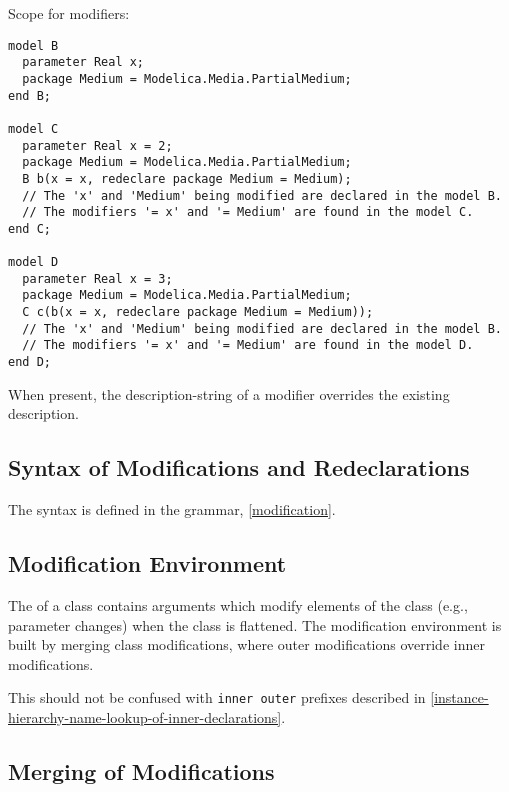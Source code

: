 \begin{example}
Scope for modifiers:
\begin{lstlisting}[language=modelica]
model B
  parameter Real x;
  package Medium = Modelica.Media.PartialMedium;
end B;

model C
  parameter Real x = 2;
  package Medium = Modelica.Media.PartialMedium;
  B b(x = x, redeclare package Medium = Medium);
  // The 'x' and 'Medium' being modified are declared in the model B.
  // The modifiers '= x' and '= Medium' are found in the model C.
end C;

model D
  parameter Real x = 3;
  package Medium = Modelica.Media.PartialMedium;
  C c(b(x = x, redeclare package Medium = Medium));
  // The 'x' and 'Medium' being modified are declared in the model B.
  // The modifiers '= x' and '= Medium' are found in the model D.
end D;
\end{lstlisting}
\end{example}

When present, the description-string of a modifier overrides the existing description.

\subsection{Syntax of Modifications and Redeclarations}\label{syntax-of-modifications-and-redeclarations}

The syntax is defined in the grammar, \cref{modification}.

\subsection{Modification Environment}\label{modification-environment}

The  of a class contains arguments which modify elements of the class (e.g., parameter changes) when the class is flattened.
The modification environment is built by merging class modifications, where outer modifications override inner modifications.

\begin{nonnormative}
This should not be confused with \lstinline!inner outer! prefixes described in \cref{instance-hierarchy-name-lookup-of-inner-declarations}.
\end{nonnormative}

\subsection{Merging of Modifications}\label{merging-of-modifications}

